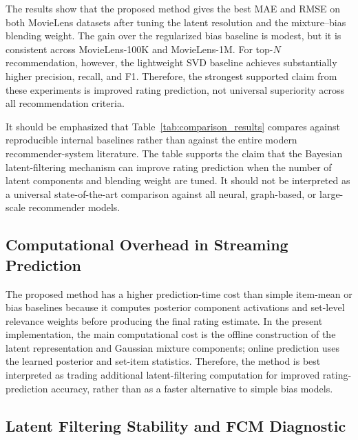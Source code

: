\documentclass{article}
\theoremstyle{plain}
\theoremstyle{definition}
\theoremstyle{remark}
\begin{document}
The results show that the proposed method gives the best MAE and RMSE on both MovieLens datasets after tuning the latent resolution and the mixture--bias blending weight. The gain over the regularized bias baseline is modest, but it is consistent across MovieLens-100K and MovieLens-1M. For top-\(N\) recommendation, however, the lightweight SVD baseline achieves substantially higher precision, recall, and F1. Therefore, the strongest supported claim from these experiments is improved rating prediction, not universal superiority across all recommendation criteria.

It should be emphasized that Table~\ref{tab:comparison_results} compares against reproducible internal baselines rather than against the entire modern recommender-system literature. The table supports the claim that the Bayesian latent-filtering mechanism can improve rating prediction when the number of latent components and blending weight are tuned. It should not be interpreted as a universal state-of-the-art comparison against all neural, graph-based, or large-scale recommender models.

\subsection{Computational Overhead in Streaming Prediction}
\label{subsec:computation_time}

The proposed method has a higher prediction-time cost than simple item-mean or bias baselines because it computes posterior component activations and set-level relevance weights before producing the final rating estimate. In the present implementation, the main computational cost is the offline construction of the latent representation and Gaussian mixture components; online prediction uses the learned posterior and set-item statistics. Therefore, the method is best interpreted as trading additional latent-filtering computation for improved rating-prediction accuracy, rather than as a faster alternative to simple bias models.

\subsection{Latent Filtering Stability and FCM Diagnostic}
\label{subsec:fcm_diagnostic}
\end{document}
